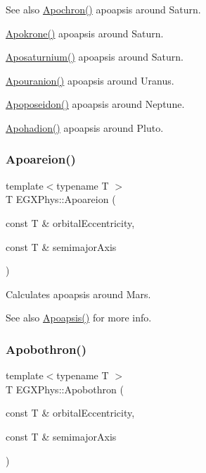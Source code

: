 \begin{DoxySeeAlso}{See also}
\mbox{\hyperlink{group___e_g_x_phys-_apoapsis_gae4ea146039e6f32022321f0998e715e8}{Apochron()}} apoapsis around Saturn. 

\mbox{\hyperlink{group___e_g_x_phys-_apoapsis_ga98557a8d49aa129c29e652c4758334d1}{Apokrone()}} apoapsis around Saturn. 

\mbox{\hyperlink{group___e_g_x_phys-_apoapsis_gac157adc20a88c8616e4822eb819f9016}{Aposaturnium()}} apoapsis around Saturn. 

\mbox{\hyperlink{group___e_g_x_phys-_apoapsis_ga6efaf5c9379f1085fa6e51bf97356124}{Apouranion()}} apoapsis around Uranus. 

\mbox{\hyperlink{group___e_g_x_phys-_apoapsis_ga89679654fff13176e989536163a27f9d}{Apoposeidon()}} apoapsis around Neptune. 

\mbox{\hyperlink{group___e_g_x_phys-_apoapsis_gaa16847ddc5763c327067075dcb6a3353}{Apohadion()}} apoapsis around Pluto. 
\end{DoxySeeAlso}
\mbox{\label{group___e_g_x_phys-_apoapsis_ga8d8ac5814f653e229e1d463b432ffca5}} 
\subsubsection{\texorpdfstring{Apoareion()}{Apoareion()}}
{\footnotesize\ttfamily template$<$typename T $>$ \\
T E\+G\+X\+Phys\+::\+Apoareion (\begin{DoxyParamCaption}\item[{const T \&}]{orbital\+Eccentricity,  }\item[{const T \&}]{semimajor\+Axis }\end{DoxyParamCaption})}



Calculates apoapsis around Mars. 

\begin{DoxySeeAlso}{See also}
\mbox{\hyperlink{group___e_g_x_phys-_apoapsis_gaf962e650bf84a568458e8eb39b1c61ba}{Apoapsis()}} for more info. 
\end{DoxySeeAlso}
\mbox{\label{group___e_g_x_phys-_apoapsis_ga6fe084b9e69f47a5032b05aa8f6bf7ad}} 
\subsubsection{\texorpdfstring{Apobothron()}{Apobothron()}}
{\footnotesize\ttfamily template$<$typename T $>$ \\
T E\+G\+X\+Phys\+::\+Apobothron (\begin{DoxyParamCaption}\item[{const T \&}]{orbital\+Eccentricity,  }\item[{const T \&}]{semimajor\+Axis }\end{DoxyParamCaption})}



